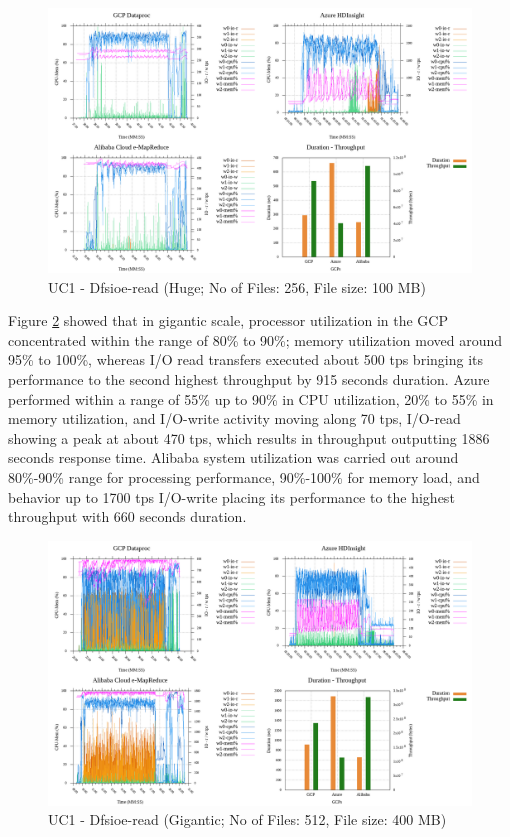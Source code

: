 \documentclass[review]{elsarticle}
\begin{document}
\begin{figure}[p]
	\caption{UC1 - Dfsioe-read (Huge; No of Files: 256, File size: 100 MB)}
	\label{fig:uc1-dfsioer-h-cmidt}
	\includegraphics[width=\textwidth]{uc1-dfsioer-h-cmidt}
	\centering
\end{figure}

Figure \ref{fig:uc1-dfsioer-g-cmidt} showed that in gigantic scale, processor utilization in the GCP concentrated within the range of 80\% to 90\%; memory utilization moved around 95\% to 100\%, whereas I/O read transfers executed about 500 tps bringing its performance to the second highest throughput by 915 seconds duration. Azure performed within a range of 55\% up to 90\% in CPU utilization, 20\% to 55\% in memory utilization, and I/O-write activity moving along 70 tps, I/O-read showing a peak at about 470 tps, which results in throughput outputting 1886 seconds response time. Alibaba system utilization was carried out around 80\%-90\% range for processing performance, 90\%-100\% for memory load, and behavior up to 1700 tps I/O-write placing its performance to the highest throughput with 660 seconds duration.

\begin{figure}[p]
	\caption{UC1 - Dfsioe-read (Gigantic; No of Files: 512, File size: 400 MB)}
	\label{fig:uc1-dfsioer-g-cmidt}
	\includegraphics[width=\textwidth]{uc1-dfsioer-g-cmidt}
	\centering
\end{figure}
\end{document}
